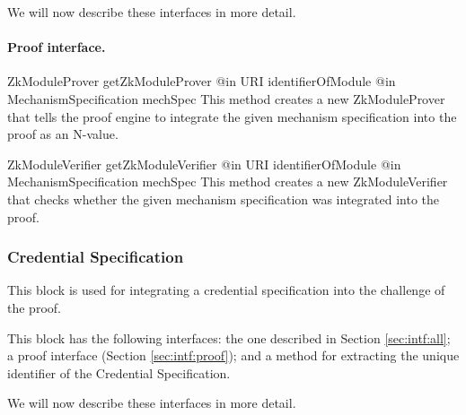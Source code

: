     We will now describe these interfaces in more detail.

    \paragraph{Proof interface.}
      \begin{method}
      {ZkModuleProver}
      {getZkModuleProver}
      {
        {@in URI identifierOfModule}
        {@in MechanismSpecification mechSpec}
      }
      This method creates a new ZkModuleProver that tells the proof engine to
      integrate the given mechanism specification into the proof as an N-value.
      \end{method}
      \begin{method}
      {ZkModuleVerifier}
      {getZkModuleVerifier}
      {
        {@in URI identifierOfModule}
        {@in MechanismSpecification mechSpec}
      }
      This method creates a new ZkModuleVerifier that checks whether the
      given mechanism specification was integrated into the proof.
      \end{method}

    \subsubsection{Credential Specification}

    This block is used for integrating a credential specification into the
    challenge of the proof.

    This block has the following interfaces:
    the one described in Section \ref{sec:intf:all};
    a proof interface (Section \ref{sec:intf:proof});
    and a method for extracting the unique identifier
    of the Credential Specification.

    We will now describe these interfaces in more detail.

